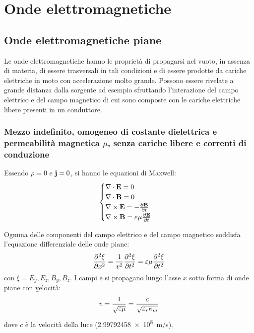 \chapter{Onde elettromagnetiche}%
\section{Onde elettromagnetiche piane}%
Le onde elettromagnetiche hanno le proprietà di propagarsi nel vuoto, in assenza di materia, di essere trasversali in tali condizioni e di essere prodotte da cariche elettriche in moto con accelerazione molto grande. Possono essere rivelate a grande distanza dalla sorgente ad esempio sfruttando l'interazione del campo elettrico e del campo magnetico di cui sono composte con le cariche elettriche libere presenti in un conduttore.

\subsection{Mezzo indefinito, omogeneo di costante dielettrica \dke e permeabilità magnetica $\mu$, senza cariche libere e correnti di conduzione}
Essendo $\rho=0$ e $\mathbf{j}=0$, si hanno le equazioni di Maxwell:
\begin{equation}\begin{split}
\begin{cases}
\nabla\cdot\mathbf{E}=0\\
\nabla\cdot\mathbf{B}=0\\
\nabla\times\mathbf{E}=-\frac{\partial\mathbf{B}}{\partial t}\\
\nabla\times\mathbf{B}=\varepsilon\mu\frac{\partial\mathbf{E}}{\partial t}
\end{cases}
\end{split}\end{equation}

Ognuna delle componenti del campo elettrico \dE e del campo magnetico \dB soddisfa l'equazione differenziale delle onde piane:
\begin{equation}\begin{split}
\frac{\partial^2\xi}{\partial x^2}=\frac{1}{v^2}\frac{\partial^2\xi}{\partial t^2}=\varepsilon\mu\frac{\partial^2\xi}{\partial t^2}
\end{split}\end{equation}
con $\xi=E_y,E_z,B_y,B_z$. I campi \dE e \dB si propagano lungo l'asse $x$ sotto forma di onde piane con \b{velocità}:
\begin{equation}\begin{split}
v=\frac{1}{\sqrt{\varepsilon\mu}}=\frac{c}{\sqrt{{\varepsilon_r}\kappa_m}}
\end{split}\end{equation}
dove $c$ è la velocità della luce (\SI[exponent-product = \cdot]{2.99792458e8}{m/s}).

